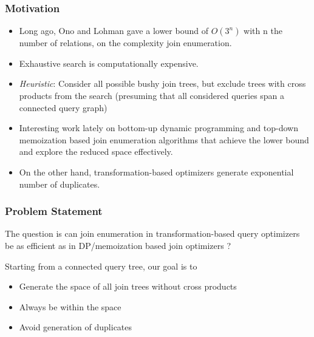 \documentclass{beamer}
\begin{document}
  \begin{frame}
  \frametitle{Motivation}
  \begin{itemize}
  \item Long ago, Ono and Lohman gave a lower bound of $O(3^n)$ with n the number of relations, on the complexity join enumeration.
  \item Exhaustive search is computationally expensive.
  \item \textit{Heuristic}: Consider all possible bushy join trees, but exclude trees with cross products from the search (presuming that all considered queries span a connected query graph)
  \item Interesting work lately on bottom-up dynamic programming and top-down memoization based join enumeration algorithms that achieve the lower bound and explore the reduced space effectively.
  \item On the other hand, transformation-based optimizers generate exponential number of duplicates.  
  \end{itemize}
  \end{frame}
  \begin{frame}
\frametitle{Problem Statement}
The question is can join enumeration in transformation-based query optimizers be as efficient as in DP/memoization based join optimizers ? 

Starting from a connected query tree, our goal is to 
\begin{itemize}
	\item Generate the space of all join trees without cross products
	\item Always be within the space 
	\item Avoid generation of duplicates
\end{itemize}
  \end{frame}
  
\end{document}

